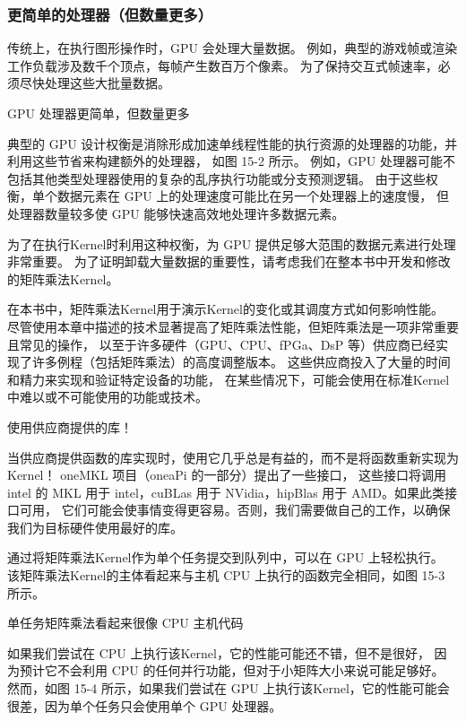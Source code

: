 \subsubsection{更简单的处理器（但数量更多）}
传统上，在执行图形操作时，GPU 会处理大量数据。 
例如，典型的游戏帧或渲染工作负载涉及数千个顶点，每帧产生数百万个像素。 
为了保持交互式帧速率，必须尽快处理这些大批量数据。

{\color{red} GPU 处理器更简单，但数量更多}

典型的 GPU 设计权衡是消除形成加速单线程性能的执行资源的处理器的功能，并利用这些节省来构建额外的处理器，
如图 15-2 所示。 例如，GPU 处理器可能不包括其他类型处理器使用的复杂的乱序执行功能或分支预测逻辑。 
由于这些权衡，单个数据元素在 GPU 上的处理速度可能比在另一个处理器上的速度慢，
但处理器数量较多使 GPU 能够快速高效地处理许多数据元素。

为了在执行Kernel时利用这种权衡，为 GPU 提供足够大范围的数据元素进行处理非常重要。 
为了证明卸载大量数据的重要性，请考虑我们在整本书中开发和修改的矩阵乘法Kernel。

\begin{remark}[关于矩阵乘法的提醒]
	在本书中，矩阵乘法Kernel用于演示Kernel的变化或其调度方式如何影响性能。
	尽管使用本章中描述的技术显著提高了矩阵乘法性能，但矩阵乘法是一项非常重要且常见的操作，
	以至于许多硬件（GPU、CPU、fPGa、DsP 等）供应商已经实现了许多例程（包括矩阵乘法）的高度调整版本。
	这些供应商投入了大量的时间和精力来实现和验证特定设备的功能，
	在某些情况下，可能会使用在标准Kernel中难以或不可能使用的功能或技术。

使用供应商提供的库！

当供应商提供函数的库实现时，使用它几乎总是有益的，而不是将函数重新实现为Kernel！
oneMKL 项目（oneaPi 的一部分）提出了一些接口，
这些接口将调用 intel 的 MKL 用于 intel，cuBLas 用于 NVidia，hipBlas 用于 AMD。如果此类接口可用，
它们可能会使事情变得更容易。否则，我们需要做自己的工作，以确保我们为目标硬件使用最好的库。
\end{remark}

通过将矩阵乘法Kernel作为单个任务提交到队列中，可以在 GPU 上轻松执行。 
该矩阵乘法Kernel的主体看起来与主机 CPU 上执行的函数完全相同，如图 15-3 所示。

{\color{red} 单任务矩阵乘法看起来很像 CPU 主机代码}

如果我们尝试在 CPU 上执行该Kernel，它的性能可能还不错，但不是很好，
因为预计它不会利用 CPU 的任何并行功能，但对于小矩阵大小来说可能足够好。 
然而，如图 15-4 所示，如果我们尝试在 GPU 上执行该Kernel，它的性能可能会很差，因为单个任务只会使用单个 GPU 处理器。


